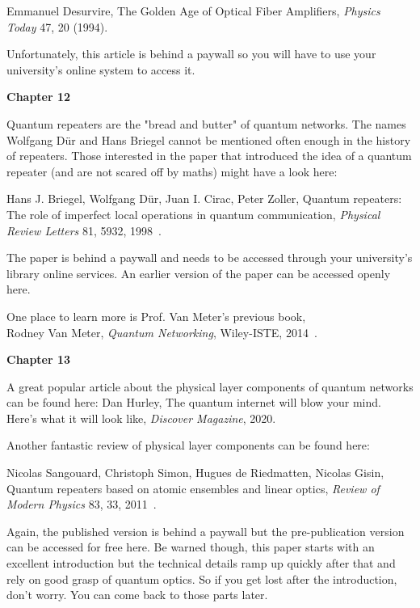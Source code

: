 Emmanuel Desurvire, The Golden Age of Optical Fiber Amplifiers, \emph{Physics Today} 47, 20 (1994).

Unfortunately, this article is behind a paywall so you will have to use your university’s online system to access it.

{\bf Chapter 12}

Quantum repeaters are the "bread and butter" of quantum networks. The names Wolfgang D\"ur and Hans Briegel cannot be mentioned often enough in the history of repeaters. Those interested in the paper that introduced the idea of a quantum repeater (and are not scared off by maths) might have a look here:

Hans J. Briegel, Wolfgang Dür, Juan I. Cirac, Peter Zoller, Quantum repeaters: The role of imperfect local operations in quantum communication, \emph{Physical Review Letters} 81, 5932, 1998~\cite{briegel98:_quant_repeater}.

The paper is behind a paywall and needs to be accessed through your university’s library online services. An earlier version of the paper can be accessed openly here.

One place to learn more is Prof. Van Meter's previous book,\\
Rodney Van Meter, \emph{Quantum Networking}, Wiley-ISTE, 2014~\cite{van-meter14:_quantum_networking}.



{\bf Chapter 13}

A great popular article about the physical layer components of quantum networks can be found here:
Dan Hurley, The quantum internet will blow your mind. Here’s what it will look like, \emph{Discover Magazine}, 2020.

Another fantastic review of physical layer components can be found here:

Nicolas Sangouard, Christoph Simon, Hugues de Riedmatten, Nicolas Gisin, Quantum repeaters based on atomic ensembles and linear optics, \emph{Review of Modern Physics} 83, 33, 2011~\cite{sangouard2011quantum}.

Again, the published version is behind a paywall but the pre-publication version can be accessed for free here. Be warned though, this paper starts with an excellent introduction but the technical details ramp up quickly after that and rely on good grasp of quantum optics. So if you get lost after the introduction, don’t worry. You can come back to those parts later.
